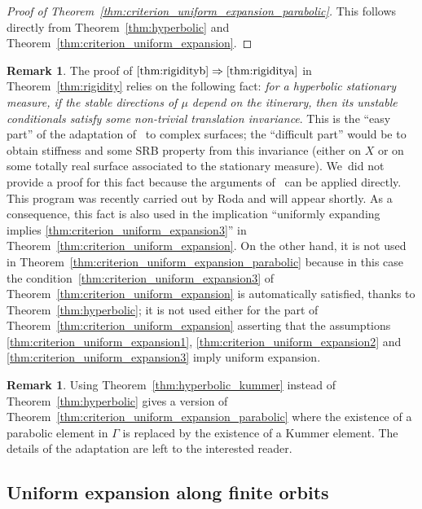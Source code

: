 \documentclass[11pt]{article}
\theoremstyle{plain}
\theoremstyle{definition}
\newtheorem{rem}[thm]{Remark}
\numberwithin{equation}{section}
\begin{document}
\begin{proof}[Proof of Theorem~\ref{thm:criterion_uniform_expansion_parabolic}]
This follows directly from Theorem~\ref{thm:hyperbolic} and Theorem~\ref{thm:criterion_uniform_expansion}.
\end{proof}

\begin{rem}\label{rmk:conditional}
The proof of $\eqref{thm:rigidityb}\Rightarrow\eqref{thm:rigiditya}$ in Theorem~\ref{thm:rigidity} relies on the following fact: {\textit{for a hyperbolic stationary measure, if the stable directions of $\mu$ depend on the itinerary, then its unstable conditionals satisfy some non-trivial translation invariance}}. This is the
``easy part'' of the adaptation of~\cite{br} to complex surfaces; the ``difficult part'' would be to obtain
stiffness and some SRB property from this invariance (either on $X$ or on some totally real surface associated to the stationary measure). We~did not provide a proof for this fact because the arguments of~\cite{br} can be applied directly. This program was recently carried out by Roda and will appear shortly.
As a consequence, this fact is also used in the implication ``uniformly expanding implies \eqref{thm:criterion_uniform_expansion3}'' in
Theorem~\ref{thm:criterion_uniform_expansion}. On the other hand, it is not used in Theorem~\ref{thm:criterion_uniform_expansion_parabolic} because in this case the condition~\eqref{thm:criterion_uniform_expansion3} of
Theorem~\ref{thm:criterion_uniform_expansion} is automatically
satisfied, thanks to Theorem~\ref{thm:hyperbolic}; it is not used either for the part of Theorem~\ref{thm:criterion_uniform_expansion} asserting that the assumptions \eqref{thm:criterion_uniform_expansion1}, \eqref{thm:criterion_uniform_expansion2} and \eqref{thm:criterion_uniform_expansion3} imply uniform expansion.
\end{rem}

\begin{rem}
Using Theorem~\ref{thm:hyperbolic_kummer} instead of Theorem~\ref{thm:hyperbolic} gives a version of
Theorem~\ref{thm:criterion_uniform_expansion_parabolic} where the existence of a parabolic element in $\Gamma$ is replaced by the existence of a Kummer element. The details of the adaptation are left to the interested reader.
\end{rem}

\subsection{Uniform expansion along finite orbits}\label{subs:finite_orbits}
\end{document}
